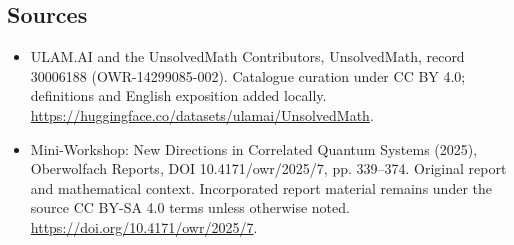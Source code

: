 \documentclass[11pt]{article}
\begin{document}
\subsection{Sources}
\begin{itemize}
\item[\hypertarget{source:30006188:1}{S1}] ULAM.AI and the UnsolvedMath Contributors, UnsolvedMath, record 30006188 (OWR-14299085-002). Catalogue curation under CC BY 4.0; definitions and English exposition added locally.
\url{https://huggingface.co/datasets/ulamai/UnsolvedMath}.
\item[\hypertarget{source:30006188:2}{S2}] Mini-Workshop: New Directions in Correlated Quantum Systems (2025), Oberwolfach Reports, DOI 10.4171/owr/2025/7, pp. 339--374. Original report and mathematical context. Incorporated report material remains under the source CC BY-SA 4.0 terms unless otherwise noted.
\url{https://doi.org/10.4171/owr/2025/7}.
\end{itemize}
\label{end:30006188}
\end{document}
